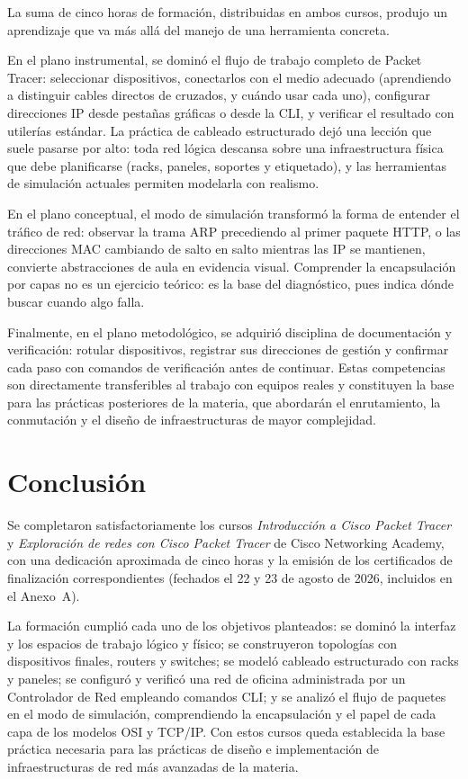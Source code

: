 \documentclass[11pt,a4paper]{article}
\begin{document}
La suma de cinco horas de formación, distribuidas en ambos cursos, produjo un
aprendizaje que va más allá del manejo de una herramienta concreta.

En el plano instrumental, se dominó el flujo de trabajo completo de Packet
Tracer: seleccionar dispositivos, conectarlos con el medio adecuado (aprendiendo
a distinguir cables directos de cruzados, y cuándo usar cada uno), configurar
direcciones IP desde pestañas gráficas o desde la CLI, y verificar el
resultado con utilerías estándar. La práctica de cableado estructurado dejó
una lección que suele pasarse por alto: toda red lógica descansa sobre una
infraestructura física que debe planificarse (racks, paneles, soportes y
etiquetado), y las herramientas de simulación actuales permiten modelarla con
realismo.

En el plano conceptual, el modo de simulación transformó la forma de entender
el tráfico de red: observar la trama ARP precediendo al primer paquete HTTP, o
las direcciones MAC cambiando de salto en salto mientras las IP se mantienen,
convierte abstracciones de aula en evidencia visual. Comprender la
encapsulación por capas no es un ejercicio teórico: es la base del
diagnóstico, pues indica dónde buscar cuando algo falla.

Finalmente, en el plano metodológico, se adquirió disciplina de documentación
y verificación: rotular dispositivos, registrar sus direcciones de gestión y
confirmar cada paso con comandos de verificación antes de continuar. Estas
competencias son directamente transferibles al trabajo con equipos reales y
constituyen la base para las prácticas posteriores de la materia, que abordarán
el enrutamiento, la conmutación y el diseño de infraestructuras de mayor
complejidad.

\section{Conclusión}

Se completaron satisfactoriamente los cursos \textit{Introducción a Cisco
Packet Tracer} y \textit{Exploración de redes con Cisco Packet Tracer} de
Cisco Networking Academy, con una dedicación aproximada de cinco horas y la
emisión de los certificados de finalización correspondientes (fechados el 22
y 23 de agosto de 2026, incluidos en el Anexo~A).

La formación cumplió cada uno de los objetivos planteados: se dominó la
interfaz y los espacios de trabajo lógico y físico; se construyeron topologías
con dispositivos finales, routers y switches; se modeló cableado estructurado
con racks y paneles; se configuró y verificó una red de oficina administrada
por un Controlador de Red empleando comandos CLI; y se analizó el flujo de
paquetes en el modo de simulación, comprendiendo la encapsulación y el papel
de cada capa de los modelos OSI y TCP/IP. Con estos cursos queda establecida
la base práctica necesaria para las prácticas de diseño e implementación de
infraestructuras de red más avanzadas de la materia.
\end{document}
